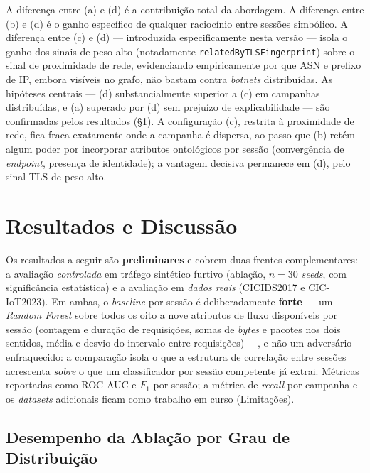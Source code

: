 \documentclass[preprint,12pt]{elsarticle}
\begin{document}
A diferença entre (a) e (d) é a contribuição total da abordagem. A diferença entre (b) e (d) é o ganho específico de qualquer raciocínio entre sessões simbólico. A diferença entre (c) e (d) --- introduzida especificamente nesta versão --- isola o ganho dos sinais de peso alto (notadamente \texttt{relatedByTLSFingerprint}) sobre o sinal de proximidade de rede, evidenciando empiricamente por que ASN e prefixo de IP, embora visíveis no grafo, não bastam contra \emph{botnets} distribuídas. As hipóteses centrais --- (d) substancialmente superior a (c) em campanhas distribuídas, e (a) superado por (d) sem prejuízo de explicabilidade --- são confirmadas pelos resultados (§\ref{sec:results}). A configuração (c), restrita à proximidade de rede, fica fraca exatamente onde a campanha é dispersa, ao passo que (b) retém algum poder por incorporar atributos ontológicos por sessão (convergência de \emph{endpoint}, presença de identidade); a vantagem decisiva permanece em (d), pelo sinal TLS de peso alto.


\section{Resultados e Discussão}
\label{sec:results}

Os resultados a seguir são \textbf{preliminares} e cobrem duas frentes complementares: a avaliação \emph{controlada} em tráfego sintético furtivo (ablação, $n = 30$ \emph{seeds}, com significância estatística) e a avaliação em \emph{dados reais} (CICIDS2017 e CIC-IoT2023). Em ambas, o \emph{baseline} por sessão é deliberadamente \textbf{forte} --- um \emph{Random Forest} sobre todos os oito a nove atributos de fluxo disponíveis por sessão (contagem e duração de requisições, somas de \emph{bytes} e pacotes nos dois sentidos, média e desvio do intervalo entre requisições) ---, e não um adversário enfraquecido: a comparação isola o que a estrutura de correlação entre sessões acrescenta \emph{sobre} o que um classificador por sessão competente já extrai. Métricas reportadas como ROC AUC e $F_1$ por sessão; a métrica de \emph{recall} por campanha e os \emph{datasets} adicionais ficam como trabalho em curso (Limitações).

\subsection{Desempenho da Ablação por Grau de Distribuição}
\end{document}
